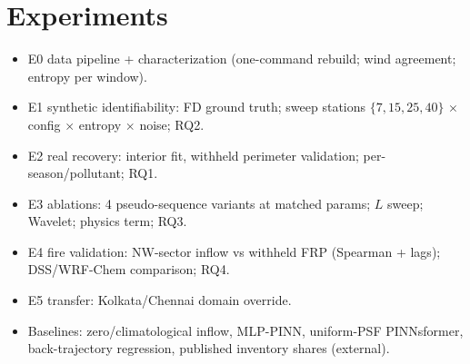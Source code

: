 \section{Experiments}
\begin{itemize}
  \item E0 data pipeline + characterization (one-command rebuild; wind agreement; entropy per window).
  \item E1 synthetic identifiability: FD ground truth; sweep stations $\{7,15,25,40\}$ $\times$ config $\times$ entropy $\times$ noise; RQ2.
  \item E2 real recovery: interior fit, withheld perimeter validation; per-season/pollutant; RQ1.
  \item E3 ablations: 4 pseudo-sequence variants at matched params; $L$ sweep; Wavelet; physics term; RQ3.
  \item E4 fire validation: NW-sector inflow vs withheld FRP (Spearman + lags); DSS/WRF-Chem comparison; RQ4.
  \item E5 transfer: Kolkata/Chennai domain override.
  \item Baselines: zero/climatological inflow, MLP-PINN, uniform-PSF PINNsformer, back-trajectory regression, published inventory shares (external).
\end{itemize}
